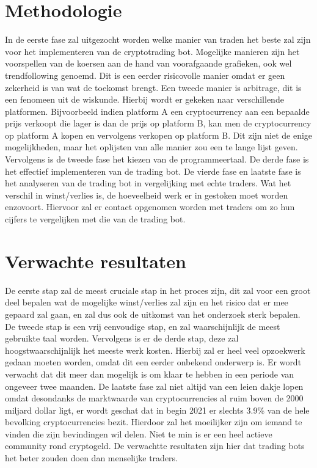 \section{Methodologie}
\label{sec:methodologie}

In de eerste fase zal uitgezocht worden welke manier van traden het beste zal zijn voor het implementeren van de cryptotrading bot. Mogelijke manieren zijn het voorspellen van de koersen aan de hand van voorafgaande grafieken, ook wel trendfollowing genoemd. Dit is een eerder risicovolle manier omdat er geen zekerheid is van wat de toekomst brengt. Een tweede manier is arbitrage, dit is een fenomeen uit de wiskunde. Hierbij wordt er gekeken naar verschillende platformen. Bijvoorbeeld indien platform A een cryptocurrency aan een bepaalde prijs verkoopt die lager is dan de prijs op platform B, kan men de cryptocurrency op platform A kopen en vervolgens verkopen op platform B.
Dit zijn niet de enige mogelijkheden, maar het oplijsten van alle manier zou een te lange lijst geven. Vervolgens is de tweede fase het kiezen van de programmeertaal. De derde fase is het effectief implementeren van de trading bot. De vierde fase en laatste fase is het analyseren van de trading bot in vergelijking met echte traders. Wat het verschil in winst/verlies is, de hoeveelheid werk er in gestoken moet worden enzovoort. Hiervoor zal er contact opgenomen worden met traders om zo hun cijfers te vergelijken met die van de trading bot.

\section{Verwachte resultaten}
\label{sec:verwachte_resultaten}

De eerste stap zal de meest cruciale stap in het proces zijn, dit zal voor een groot deel bepalen wat de mogelijke winst/verlies zal zijn en het risico dat er mee gepaard zal gaan, en zal dus ook de uitkomst van het onderzoek sterk bepalen. De tweede stap is een vrij eenvoudige stap, en zal waarschijnlijk de meest gebruikte taal worden. Vervolgens is er de derde stap, deze zal hoogstwaarschijnlijk het meeste werk kosten. Hierbij zal er heel veel opzoekwerk gedaan moeten worden, omdat dit een eerder onbekend onderwerp is.
Er wordt verwacht dat dit meer dan mogelijk is om klaar te hebben in een periode van ongeveer twee maanden. De laatste fase zal niet altijd van een leien dakje lopen omdat desondanks de marktwaarde van cryptocurrencies al ruim boven de 2000 miljard dollar ligt, er wordt geschat dat in begin 2021 er slechts 3.9\% van de hele bevolking cryptocurrencies bezit. \autocite{Triple2021} Hierdoor zal het moeilijker zijn om iemand te vinden die zijn bevindingen wil delen. Niet te min is er een heel actieve community rond cryptogeld. De verwachtte resultaten zijn hier dat trading bots het beter zouden doen dan menselijke traders.

